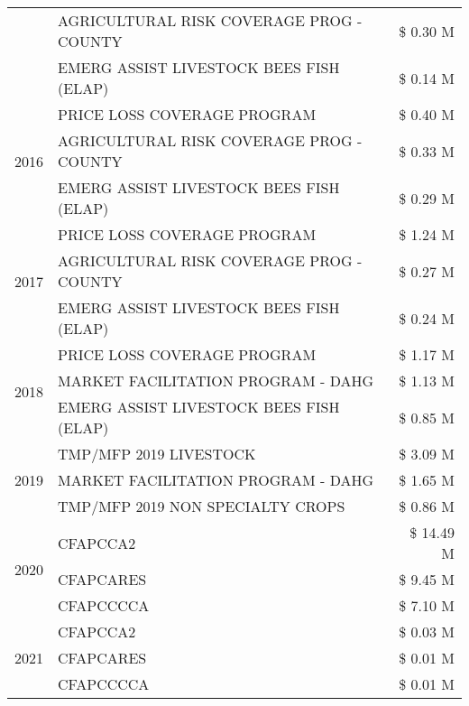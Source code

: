 \begin{tabular}{llr}
 & AGRICULTURAL RISK COVERAGE PROG - COUNTY & \$ 0.30 M \\
 & EMERG ASSIST LIVESTOCK BEES FISH (ELAP) & \$ 0.14 M \\
\cline{1-3}
\multirow[t]{3}{*}{2016} & PRICE LOSS COVERAGE PROGRAM                   & \$ 0.40 M \\
 & AGRICULTURAL RISK COVERAGE PROG - COUNTY      & \$ 0.33 M \\
 & EMERG ASSIST LIVESTOCK BEES FISH (ELAP)       & \$ 0.29 M \\
\cline{1-3}
\multirow[t]{3}{*}{2017} & PRICE LOSS COVERAGE PROGRAM & \$ 1.24 M \\
 & AGRICULTURAL RISK COVERAGE PROG - COUNTY & \$ 0.27 M \\
 & EMERG ASSIST LIVESTOCK BEES FISH (ELAP) & \$ 0.24 M \\
\cline{1-3}
\multirow[t]{3}{*}{2018} & PRICE LOSS COVERAGE PROGRAM & \$ 1.17 M \\
 & MARKET FACILITATION PROGRAM - DAHG & \$ 1.13 M \\
 & EMERG ASSIST LIVESTOCK BEES FISH (ELAP) & \$ 0.85 M \\
\cline{1-3}
\multirow[t]{3}{*}{2019} & TMP/MFP 2019 LIVESTOCK & \$ 3.09 M \\
 & MARKET FACILITATION PROGRAM - DAHG & \$ 1.65 M \\
 & TMP/MFP 2019 NON SPECIALTY CROPS & \$ 0.86 M \\
\cline{1-3}
\multirow[t]{3}{*}{2020} & CFAPCCA2 & \$ 14.49 M \\
 & CFAPCARES & \$ 9.45 M \\
 & CFAPCCCCA & \$ 7.10 M \\
\cline{1-3}
\multirow[t]{3}{*}{2021} & CFAPCCA2 & \$ 0.03 M \\
 & CFAPCARES & \$ 0.01 M \\
 & CFAPCCCCA & \$ 0.01 M \\
\cline{1-3}
\bottomrule
\end{tabular}
